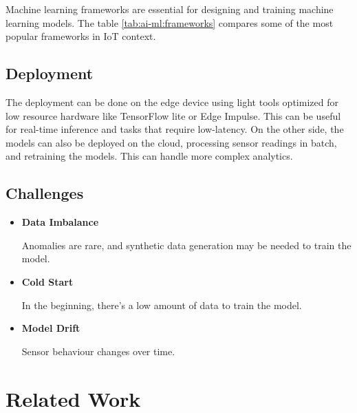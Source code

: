 Machine learning frameworks are essential for designing and training machine
learning models. The table \ref{tab:ai-ml:frameworks}
compares some of the most popular frameworks in IoT context.

\subsection{Deployment}

The deployment can be done on the edge device using light tools optimized for
low resource hardware like TensorFlow lite or Edge Impulse. This can be useful
for real-time inference and tasks that require low-latency.
On the other side, the models can also be deployed on the cloud, processing
sensor readings in batch, and retraining the models. This can handle more
complex analytics.

\subsection{Challenges}

\begin{itemize}
	\item \textbf{Data Imbalance}

	      Anomalies are rare, and synthetic data generation may be needed to train
	      the model.
	\item \textbf{Cold Start}

	      In the beginning, there's a low amount of data to train the model.
	\item \textbf{Model Drift}

	      Sensor behaviour changes over time.
\end{itemize}

\section{Related Work}
